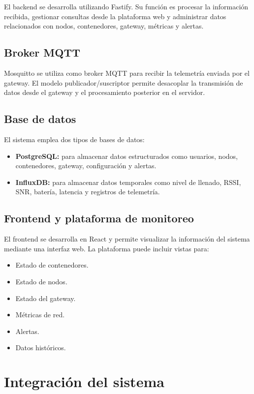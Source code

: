 El backend se desarrolla utilizando Fastify. Su función es procesar la información recibida, gestionar consultas desde la plataforma web y administrar datos relacionados con nodos, contenedores, gateway, métricas y alertas.

\subsection{Broker MQTT}

Mosquitto se utiliza como broker MQTT para recibir la telemetría enviada por el gateway. El modelo publicador/suscriptor permite desacoplar la transmisión de datos desde el gateway y el procesamiento posterior en el servidor.

\subsection{Base de datos}

El sistema emplea dos tipos de bases de datos:

\begin{itemize}
    \item \textbf{PostgreSQL:} para almacenar datos estructurados como usuarios, nodos, contenedores, gateway, configuración y alertas.
    \item \textbf{InfluxDB:} para almacenar datos temporales como nivel de llenado, RSSI, SNR, batería, latencia y registros de telemetría.
\end{itemize}

\subsection{Frontend y plataforma de monitoreo}

El frontend se desarrolla en React y permite visualizar la información del sistema mediante una interfaz web. La plataforma puede incluir vistas para:

\begin{itemize}
    \item Estado de contenedores.
    \item Estado de nodos.
    \item Estado del gateway.
    \item Métricas de red.
    \item Alertas.
    \item Datos históricos.
\end{itemize}

\section{Integración del sistema}

